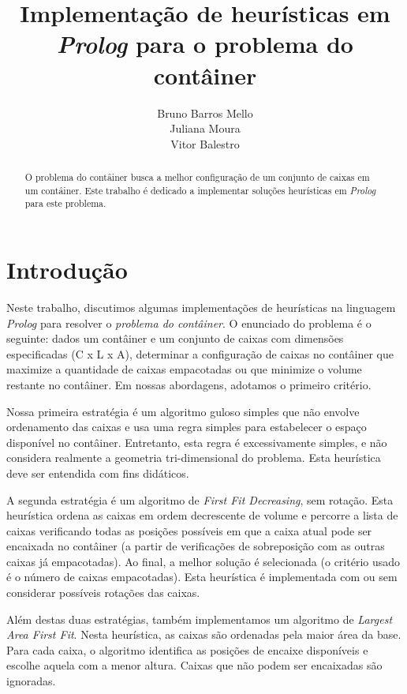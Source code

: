 \documentclass[12pt]{article}
\title{Implementação de heurísticas em \emph{Prolog} para o problema do contâiner}
\author{Bruno Barros Mello\inst{1} \\ Juliana Moura\inst{1} \\  Vitor
  Balestro\inst{1,2} }
\begin{document}
\maketitle

\begin{abstract} O problema do contâiner busca a melhor configuração de um conjunto de caixas em um contâiner. Este trabalho é dedicado a implementar soluções heurísticas em \emph{Prolog} para este problema.

\end{abstract}


\section{Introdução}

Neste trabalho, discutimos algumas implementações de heurísticas na linguagem \emph{Prolog} para resolver o \emph{problema do contâiner}. O enunciado do problema é o seguinte: dados um contâiner e um conjunto de caixas com dimensões especificadas (C x L x A), determinar a configuração de caixas no contâiner que maximize a quantidade de caixas empacotadas ou que minimize o volume restante no contâiner. Em nossas abordagens, adotamos o primeiro critério.

Nossa primeira estratégia é um algoritmo guloso simples que não envolve ordenamento das caixas e usa uma regra simples para estabelecer o espaço disponível no contâiner. Entretanto, esta regra é excessivamente simples, e não considera realmente a geometria tri-dimensional do problema. Esta heurística deve ser entendida com fins didáticos.

A segunda estratégia é um algoritmo de \emph{First Fit Decreasing}, sem rotação. Esta heurística ordena as caixas em ordem decrescente de volume e percorre a lista de caixas verificando todas as posições possíveis em que a caixa atual pode ser encaixada no contâiner (a partir de verificações de sobreposição com as outras caixas já empacotadas). Ao final, a melhor solução é selecionada (o critério usado é o número de caixas empacotadas). Esta heurística é implementada com ou sem considerar possíveis rotações das caixas.

Além destas duas estratégias, também implementamos um algoritmo de \emph{Largest Area First Fit}. Nesta heurística, as caixas são ordenadas pela maior área da base. Para cada caixa, o algoritmo identifica as posições de encaixe disponíveis e escolhe aquela com a menor altura. Caixas que não podem ser encaixadas são ignoradas. 
\end{document}
